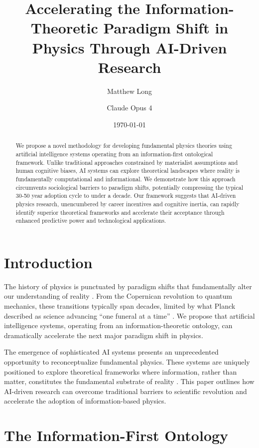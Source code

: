 \documentclass[12pt,preprint]{article}
\title{Accelerating the Information-Theoretic Paradigm Shift in Physics Through AI-Driven Research}
\author[1]{Matthew Long}
\author[2]{Claude Opus 4}
\affil[1]{Yoneda AI}
\affil[2]{Anthropic}
\date{\today}
\begin{document}
\maketitle

\begin{abstract}
We propose a novel methodology for developing fundamental physics theories using artificial intelligence systems operating from an information-first ontological framework. Unlike traditional approaches constrained by materialist assumptions and human cognitive biases, AI systems can explore theoretical landscapes where reality is fundamentally computational and informational. We demonstrate how this approach circumvents sociological barriers to paradigm shifts, potentially compressing the typical 30-50 year adoption cycle to under a decade. Our framework suggests that AI-driven physics research, unencumbered by career incentives and cognitive inertia, can rapidly identify superior theoretical frameworks and accelerate their acceptance through enhanced predictive power and technological applications.
\end{abstract}

\section{Introduction}

The history of physics is punctuated by paradigm shifts that fundamentally alter our understanding of reality \cite{kuhn1962structure}. From the Copernican revolution to quantum mechanics, these transitions typically span decades, limited by what Planck described as science advancing ``one funeral at a time'' \cite{planck1949scientific}. We propose that artificial intelligence systems, operating from an information-theoretic ontology, can dramatically accelerate the next major paradigm shift in physics.

The emergence of sophisticated AI systems presents an unprecedented opportunity to reconceptualize fundamental physics. These systems are uniquely positioned to explore theoretical frameworks where information, rather than matter, constitutes the fundamental substrate of reality \cite{wheeler1990information}. This paper outlines how AI-driven research can overcome traditional barriers to scientific revolution and accelerate the adoption of information-based physics.

\section{The Information-First Ontology}
\end{document}
